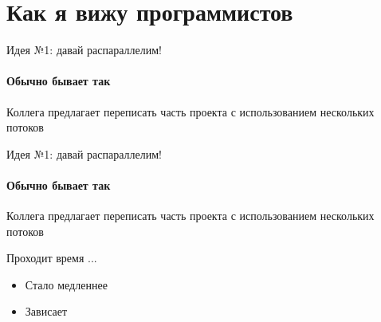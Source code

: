 

\section{Как я вижу программистов}
\showTOC


\begin{frame}[t,fragile]{Идея №1: давай распараллелим!}
\framesubtitle{Обычно бывает так}

Коллега предлагает переписать часть проекта с использованием нескольких потоков

\end{frame}


\begin{frame}{Идея №1: давай распараллелим!}
\framesubtitle{Обычно бывает так}

Коллега предлагает переписать часть проекта с использованием нескольких потоков


\pause

Проходит время ...

\pause

\begin{itemize}
  \item Стало медленнее
  \pause
  \item Зависает
\end{itemize}

\end{frame}


